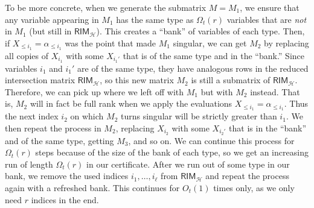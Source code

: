 \documentclass{article}[11pt]
\begin{document}
To be more concrete, when we generate the submatrix $M = M_1$, we ensure that any variable appearing in $M_1$ has the same type as $\Omega_t(r)$ variables that are \emph{not} in $M_1$ (but still in $\mathsf{RIM}_\mathcal{H}$).
This creates a ``bank'' of variables of each type.
Then, if $X_{\le i_1}=\alpha_{\le i_1}$ was the point that made $M_1$ singular, we can get $M_2$ by replacing all copies of $X_{i_1}$ with some $X_{i_1'}$ that is of the same type and in the ``bank.''
Since variables $i_1$ and $i_1'$ are of the same type, they have analogous rows in the reduced intersection matrix 
$\mathsf{RIM}_\mathcal{H}$, so this new matrix $M_2$ is still a submatrix of $\mathsf{RIM}_\mathcal{H}$. 
Therefore, we can pick up where we left off with $M_1$ but with $M_2$ instead. That is, $M_2$ will in fact be full rank when we apply the evaluations $X_{\le i_1} = \alpha_{\le i_1}$. Thus the next index $i_2$ on which $M_2$ turns singular will be strictly greater than $i_1$.
We then repeat the process in $M_2$, replacing $X_{i_2}$ with some $X_{i_2'}$ that is in the ``bank'' and of the same type, getting $M_3$, and so on.
We can continue this process for $\Omega_t(r)$ steps because of the size of the bank of each type, so we get an increasing run of length $\Omega_t(r)$ in our certificate.
After we run out of some type in our bank, we remove the used indices $i_1,\dots,i_\ell$ from $\mathsf{RIM}_\mathcal{H}$ and repeat the process again with a refreshed bank. This continues for $O_t(1)$ times only, as we only need $r$ indices in the end.
\end{document}
